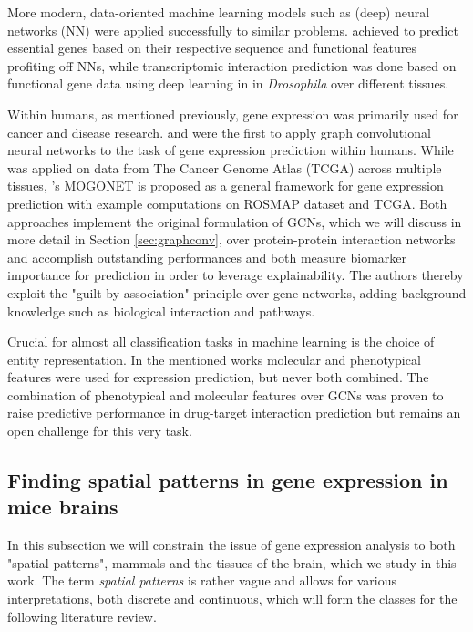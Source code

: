 \documentclass[]{article}
\renewcommand{\cite}{\citep}
\begin{document}
More modern, data-oriented machine learning models such as (deep) neural networks (NN) were applied successfully to similar problems. \citet{aromolaran2020essential} achieved to predict essential genes based on their respective sequence and functional features profiting off NNs, while transcriptomic interaction prediction was done based on functional gene data using deep learning in \citet{yang2019predicting} in \textit{Drosophila} over different tissues. 

Within humans, as mentioned previously, gene expression was primarily used for cancer and disease research. \citet{schulte2021integration} and \citet{wang2021mogonet} were the first to apply graph convolutional neural networks to the task of gene expression prediction within humans. While \citet{schulte2021integration} was applied on data from The Cancer Genome Atlas (TCGA)\cite{tomczak2015review} across multiple tissues, \citet{wang2021mogonet}'s MOGONET is proposed as a general framework for gene expression prediction with example computations on ROSMAP dataset and TCGA. Both approaches implement the original formulation of GCNs\cite{GCNConv}, which we will discuss in more detail in Section \ref{sec:graphconv}, over protein-protein interaction networks and accomplish outstanding performances and both measure biomarker importance for prediction in order to leverage explainability. The authors thereby exploit the "guilt by association" principle \cite{Oliver2000, Gillis2012} over gene networks, adding background knowledge such as biological interaction and pathways.

Crucial for almost all classification tasks in machine learning is the choice of entity representation. In the mentioned works molecular \cite{schulte2021integration, modencode2010identification, noble2006support} and phenotypical \cite{wang2021mogonet, chikina2009global} features were used for expression prediction, but never both combined. The combination of phenotypical and molecular features over GCNs was proven to raise predictive performance in drug-target interaction prediction \cite{hinnerichs2021dti} but remains an open challenge for this very task.


\subsection{Finding spatial patterns in gene expression in mice brains}
\label{sec:relatedwork_micebrains}
In this subsection we will constrain the issue of gene expression analysis to both "spatial patterns", mammals and the tissues of the brain, which we study in this work. The term \textit{spatial patterns} is rather vague and allows for various interpretations, both discrete and continuous, which will form the classes for the following literature review.\\
\end{document}
